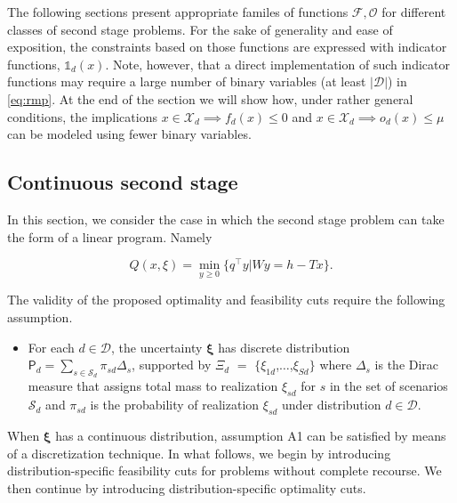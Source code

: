 \documentclass[12pt]{article}
\theoremstyle{thmstylethree}%
\newcommand{\mtc}[1] {\mathcal{#1}}
\newcommand{\pr}[1]{\ensuremath{\mathsf{#1}}}
\newcommand{\rv}[1]{\ensuremath{\bm{#1}}}
\def\Ind{\ensuremath{\mathbb{1}}}
\begin{document}
The following sections present appropriate familes of functions $\mtc{F}, \mtc{O}$ for different classes of second stage problems.
For the sake of generality and ease of exposition, the constraints based on those functions are expressed with indicator functions, $\Ind_d(x)$. 
Note, however, that a direct implementation of such indicator functions may require a large number of binary variables (at least $|\mtc{D}|$) in \eqref{eq:rmp}. At the end of the section we will show how, under rather general conditions, the implications $x\in\mtc{X}_d\implies f_{d}(x)\leq 0$ and $x\in\mtc{X}_d\implies o_{d}(x) \leq \mu$ can be modeled using fewer binary variables.  


\subsection{Continuous second stage}\label{sec:benders:cont}
In this section, we consider the case in which the second stage problem can take the form of a linear program. 
Namely

\begin{equation}\label{eq:sp2s:continuous}
Q(x,\xi)=\min_{y\geq 0}\{q^\top y|Wy=h-Tx\}.
\end{equation}

The validity of the proposed optimality and feasibility cuts require the following assumption.

\begin{itemize}
    \item[\textbf{A1}] For each $d\in\mtc{D}$, the uncertainty $\rv{\xi}$ has discrete distribution $\pr{P}_d=\sum_{s\in\mtc{S}_d}\pi_{sd}\Delta_s$, supported by $\Xi_d$ $=$ $\{$$\xi_{1d}$,$\ldots$,$\xi_{Sd}\}$ where $\Delta_s$ is the Dirac measure that assigns total mass to realization $\xi_{sd}$ for $s$ in the set of scenarios $\mtc{S}_d$  and $\pi_{sd}$ is the probability of realization $\xi_{sd}$ under distribution $d\in\mtc{D}$. 
\end{itemize}

When $\rv{\xi}$ has a continuous distribution, assumption A1 can be satisfied by means of a discretization technique. In what follows, we begin by introducing distribution-specific feasibility cuts for problems without complete recourse. We then continue by introducing distribution-specific optimality cuts. 
\end{document}
